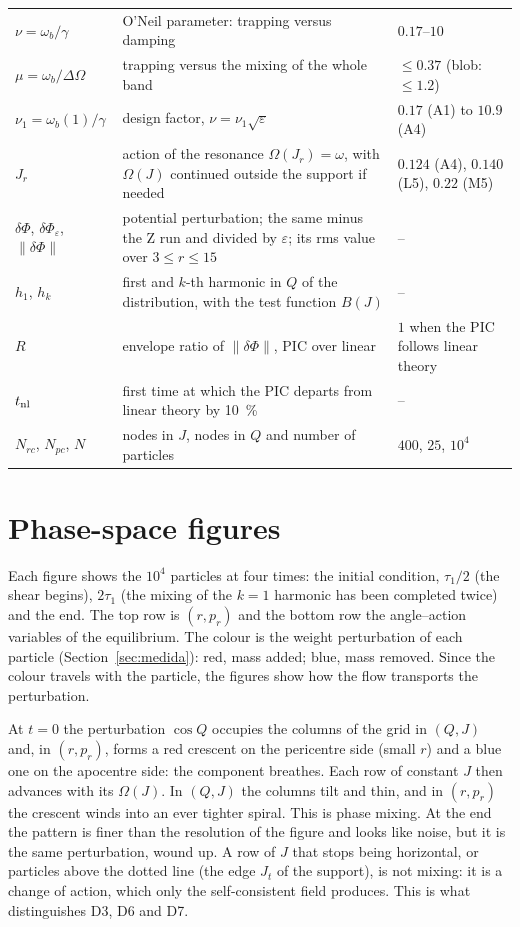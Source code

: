 \documentclass[11pt,a4paper]{article}
\begin{document}
\begin{center}
\begin{tabular}{L{2.4cm}L{7.0cm}L{4.3cm}}
$\nu=\omega_b/\gamma$ & O'Neil parameter: trapping versus damping & $0.17$--$10$\\
$\mu=\omega_b/\Delta\Omega$ & trapping versus the mixing of the whole band & $\le0.37$ (blob: $\le1.2$)\\
$\nu_1=\omega_b(1)/\gamma$ & design factor, $\nu=\nu_1\sqrt\varepsilon$ & $0.17$ (A1) to $10.9$ (A4)\\
$J_r$ & action of the resonance $\Omega(J_r)=\omega$, with $\Omega(J)$ continued outside the support if needed & $0.124$ (A4), $0.140$ (L5), $0.22$ (M5)\\
$\delta\Phi$, $\delta\Phi_\varepsilon$, $\|\delta\Phi\|$ & potential perturbation; the same minus the Z run and divided by $\varepsilon$; its rms value over $3\le r\le15$ & --\\
$h_1$, $h_k$ & first and $k$-th harmonic in $Q$ of the distribution, with the test function $B(J)$ & --\\
$R$ & envelope ratio of $\|\delta\Phi\|$, PIC over linear & $1$ when the PIC follows linear theory\\
$t_{\rm nl}$ & first time at which the PIC departs from linear theory by \SI{10}{\%} & --\\
$N_{rc}$, $N_{pc}$, $N$ & nodes in $J$, nodes in $Q$ and number of particles & $400$, $25$, $10^4$\\
\bottomrule
\end{tabular}
\end{center}

\section{Phase-space figures}
\label{sec:fase}

Each figure shows the $10^4$ particles at four times: the initial condition, $\tau_1/2$ (the
shear begins), $2\tau_1$ (the mixing of the $k=1$ harmonic has been completed twice) and the
end. The top row is $(r,p_r)$ and the bottom row the angle--action variables of the
equilibrium. The colour is the weight perturbation of each particle
(Section~\ref{sec:medida}): red, mass added; blue, mass removed. Since the colour travels
with the particle, the figures show how the flow transports the perturbation.

At $t=0$ the perturbation $\cos Q$ occupies the columns of the grid in $(Q,J)$ and, in
$(r,p_r)$, forms a red crescent on the pericentre side (small $r$) and a blue one on the
apocentre side: the component breathes. Each row of constant $J$ then advances with its
$\Omega(J)$. In $(Q,J)$ the columns tilt and thin, and in $(r,p_r)$ the crescent winds into
an ever tighter spiral. This is phase mixing. At the end the pattern is finer than the
resolution of the figure and looks like noise, but it is the same perturbation, wound
up. A row of $J$ that stops being horizontal, or particles above the dotted line (the
edge $J_t$ of the support), is not mixing: it is a change of action, which only the
self-consistent field produces. This is what distinguishes D3, D6 and D7.
\end{document}
